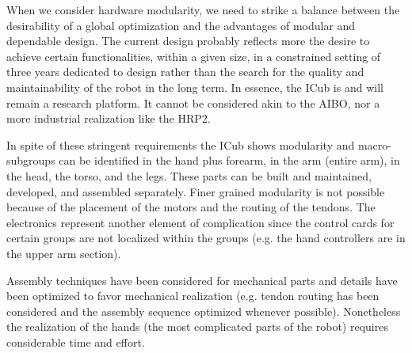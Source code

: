 When we consider hardware modularity, we need to strike a balance
between the desirability of a global optimization and the advantages of modular and 
dependable design. The current design probably reflects more the desire
to achieve certain functionalities, within a given size, in a constrained setting of three 
years dedicated to design rather than the search for the quality and maintainability 
of the robot in the long term. In essence, the ICub is and will remain a research 
platform. It cannot be considered akin to the AIBO, nor a more industrial realization 
like the HRP2.

In spite of these stringent requirements the ICub shows modularity and macro-subgroups
can be identified in the hand plus forearm, in the arm (entire arm), in the head, the torso,
and the legs. These parts can be built and maintained, developed, and assembled 
separately. Finer grained modularity is not possible because of the placement of the
motors and the routing of the tendons. The electronics represent another element of
complication since the control cards for certain groups are not localized within the 
groups (e.g. the hand controllers are in the upper arm section).

Assembly techniques have been considered for mechanical parts and details have been
optimized to favor mechanical realization (e.g. tendon routing has been considered and
the assembly sequence optimized whenever possible). Nonetheless the realization 
of the hands (the most complicated parts of the robot) requires considerable time 
and effort.

